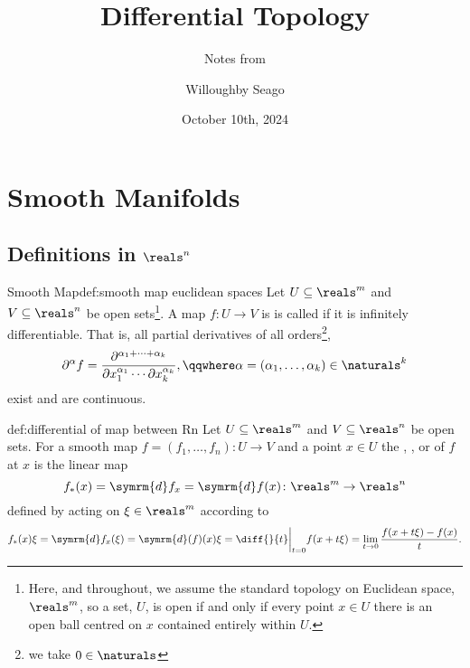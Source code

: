 \documentclass[fleqn]{NotesClass}
\title{Differential Topology}
\author{Willoughby Seago}
\date{October 10th, 2024}
\subtitle{Notes from}
\renewcommand{\dl}{\symrm{d}}
\begin{document}
    \frontmatter
    \titlepage
    \innertitlepage{}
    \tableofcontents
    \mainmatter
    
    \chapter{Smooth Manifolds}
    \section{Definitions in \texorpdfstring{\(\reals^n\)}{Rn}}
    \begin{dfn}{Smooth Map}{def:smooth map euclidean spaces}
        Let \(U \subseteq \reals^m\) and \(V \subseteq \reals^n\) be open sets\footnote{Here, and throughout, we assume the standard topology on Euclidean space, \(\reals^m\), so a set, \(U\), is open if and only if every point \(x \in U\) there is an open ball centred on \(x\) contained entirely within \(U\).}.
        A map \(f \colon U \to V\) is  is called  if it is infinitely differentiable.
        That is, all partial derivatives of all orders\footnote{we take \(0 \in \naturals\)},
        \begin{equation}
            \partial^\alpha f = \frac{\partial^{\alpha_1 + \dotsb + \alpha_k}}{\partial x_1^{\alpha_1} \dotsm \partial x_k^{\alpha_k}}, \qqwhere \alpha = (\alpha_1, \dotsc, \alpha_k) \in \naturals^{k}
        \end{equation}
        exist and are continuous.
    \end{dfn}
    
    \begin{dfn}{}{def:differential of map between Rn}
        Let \(U \subseteq \reals^m\) and \(V \subseteq \reals^n\) be open sets.
        For a smooth map \(f = (f_1, \dotsc, f_n) \colon U \to V\) and a point \(x \in U\) the , , or  of \(f\) at \(x\) is the linear map
        \begin{equation}
            f_*(x) = \dl f_x = \dl f(x) \colon \reals^m \to \reals^n
        \end{equation}
        defined by acting on \(\xi \in \reals^m\) according to
        \begin{equation}
            f_*(x)\xi = \dl f_x(\xi) = \dl(f)(x)\xi = \diff{}{t}\bigg|_{t = 0} f(x + t\xi) = \lim_{t \to 0} \frac{f(x + t\xi) - f(x)}{t}.
        \end{equation}
    \end{dfn}
    
\end{document}
